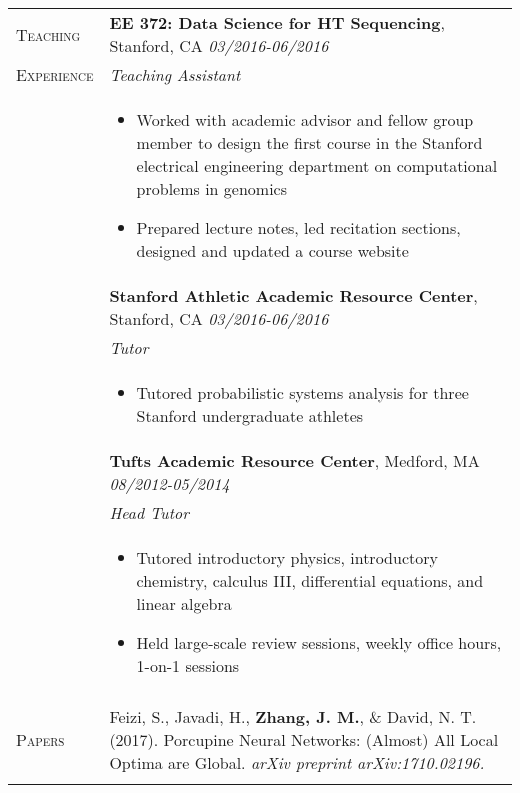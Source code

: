 \documentclass[letterpaper,11pt,oneside]{article}
\begin{document}
\begin{longtable}{@{} p{2.5cm} p{14.8cm}}
  \large{\textsc{Teaching}}  & \textbf{EE 372: Data Science for HT Sequencing}, Stanford, CA \hfill \textit{03/2016-06/2016} \\
  \large{\textsc{Experience}}  & \textit{Teaching Assistant} \\ 
& 
\vspace{-7mm}
\begin{itemize}[leftmargin=.5cm]
	\setlength\itemsep{-0.3em}
	\item Worked with academic advisor and fellow group member to design the first course in the Stanford electrical engineering department on computational problems in genomics
	\item Prepared lecture notes, led recitation sections, designed and updated a course website
\end{itemize} 
\\

& \textbf{Stanford Athletic Academic Resource Center}, Stanford, CA \hfill \textit{03/2016-06/2016} \\
& \textit{Tutor} \\ 
& 
\vspace{-7mm}
\begin{itemize}[leftmargin=.5cm]
	\setlength\itemsep{-0.3em}
	\item Tutored probabilistic systems analysis for three Stanford undergraduate athletes
\end{itemize} 
\\

& \textbf{Tufts Academic Resource Center}, Medford, MA \hfill \textit{08/2012-05/2014} \\*
& \textit{Head Tutor} \\*
& 
\vspace{-7mm}
\begin{itemize}[leftmargin=.5cm]
	\setlength\itemsep{-0.3em}
	\item Tutored introductory physics, introductory chemistry, calculus III, differential equations, and linear algebra
	\item Held large-scale review sessions, weekly office hours, 1-on-1 sessions
\end{itemize} 
\\
& \\
     
 \large{\textsc{Papers}} & Feizi, S., Javadi, H., \textbf{Zhang, J. M.}, \& David, N. T. (2017). Porcupine Neural Networks: (Almost) All Local Optima are Global. \textit{arXiv preprint arXiv:1710.02196.} \\
 	& \\
 

\end{longtable}
\end{document}
